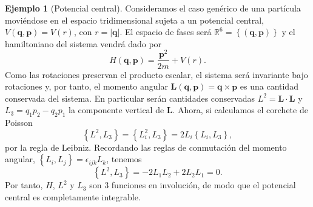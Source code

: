 \documentclass[11pt,a4paper,twoside]{article}
\theoremstyle{definition} \newtheorem{defn}[thm]{Definición}
\theoremstyle{definition} \newtheorem{ejemplo}[thm]{Ejemplo}
\theoremstyle{definition} \newtheorem{ejercicio}[thm]{Ejercicio}
\theoremstyle{remark} \newtheorem*{obs}{Observación}
\def\RR{\mathbb{R}}
\newcommand{\vect}[1]{\mathbf{#1}}
\newcommand{\pois}[2]{\left\lbrace#1,#2\right\rbrace}
\begin{document}
  \begin{ejemplo}[Potencial central]
    Consideramos el caso genérico de una partícula moviéndose en el espacio tridimensional sujeta a un potencial central, $V(\vect{q},\vect{p})=V(r)$, con $r=|\vect{q}|$. El espacio de fases será $\RR^6=\left\{ (\vect{q},\vect{p}) \right\}$ y el hamiltoniano del sistema vendrá dado por
    \begin{equation}
      H(\vect{q},\vect{p})=\frac{\vect{p}^2}{2m}+V(r).
      \label{eq:central}
    \end{equation}
    Como las rotaciones preservan el producto escalar, el sistema será invariante bajo rotaciones y, por tanto, el momento angular $\vect{L}(\vect{q},\vect{p})=\vect{q}\times \vect{p}$ es una cantidad conservada del sistema. En particular serán cantidades conservadas $L^2=\vect{L}\cdot \vect{L}$ y $L_3=q_1p_2-q_2p_1$ la componente vertical de $\vect{L}$. Ahora, si calculamos el corchete de Poisson
  \begin{equation*}
    \pois{L^2}{L_3}=\pois{L_i^2}{L_3}=2L_i\pois{L_i}{L_3},
  \end{equation*}
  por la regla de Leibniz. Recordando las reglas de conmutación del momento angular, $\left\{ L_i,L_j \right\}=\epsilon_{ijk}L_k$, tenemos
\begin{equation*}
  \pois{L^2}{L_3}=-2L_1L_2+2L_2L_1=0.
\end{equation*}
Por tanto, $H$, $L^2$ y $L_3$ son $3$ funciones en involución, de modo que el potencial central es completamente integrable.
  \end{ejemplo}
\end{document}
